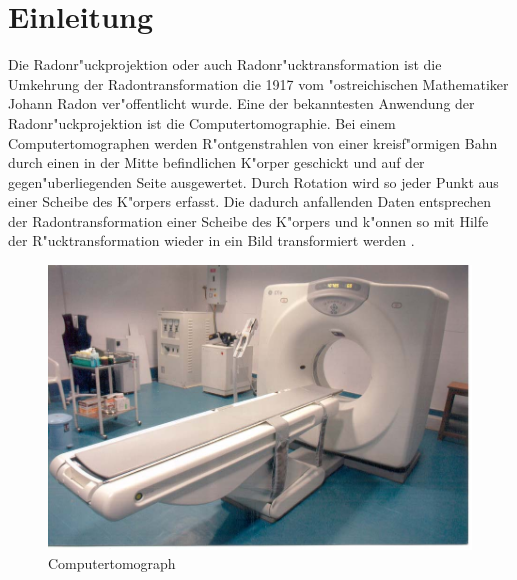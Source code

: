 \section{Einleitung}

Die Radonr"uckprojektion oder auch Radonr"ucktransformation ist
die Umkehrung der Radontransformation die 1917 vom "ostreichischen
Mathematiker Johann Radon ver"offentlicht wurde. Eine der bekanntesten
Anwendung der Radonr"uckprojektion ist die Computertomographie. Bei einem
Computertomographen werden R"ontgenstrahlen von einer kreisf"ormigen
Bahn durch einen in der Mitte befindlichen K"orper geschickt und auf
der gegen"uberliegenden Seite ausgewertet. Durch Rotation wird so jeder
Punkt aus einer Scheibe des K"orpers erfasst. Die dadurch anfallenden
Daten entsprechen der Radontransformation einer Scheibe des K"orpers
und k"onnen so mit Hilfe der R"ucktransformation wieder in ein Bild
transformiert werden
\cite{wikiRadontransform}.

\begin{figure}[ht!]\centering
	\begin{adjustbox}{scale=0.5, keepaspectratio}
		\includegraphics{radon/images/tomograph.jpg}
	\end{adjustbox}
	\caption{Computertomograph \cite{computertomographBild}}
\end{figure}
